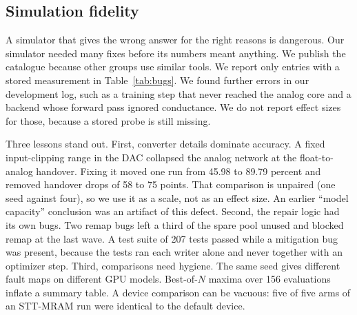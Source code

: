 \documentclass[journal]{IEEEtran}
\begin{document}
\subsection{Simulation fidelity}
\label{sec:fidelity}
A simulator that gives the wrong answer for the right reasons is dangerous.
Our simulator needed many fixes before its numbers meant anything.
We publish the catalogue because other groups use similar tools.
We report only entries with a stored measurement in Table~\ref{tab:bugs}.
We found further errors in our development log, such as a training step that never reached the analog core and a backend whose forward pass ignored conductance.
We do not report effect sizes for those, because a stored probe is still missing.

Three lessons stand out.
First, converter details dominate accuracy.
A fixed input-clipping range in the DAC collapsed the analog network at the float-to-analog handover.
Fixing it moved one run from 45.98 to 89.79 percent and removed handover drops of 58 to 75 points.
That comparison is unpaired (one seed against four), so we use it as a scale, not as an effect size.
An earlier ``model capacity'' conclusion was an artifact of this defect.
Second, the repair logic had its own bugs.
Two remap bugs left a third of the spare pool unused and blocked remap at the last wave.
A test suite of 207 tests passed while a mitigation bug was present, because the tests ran each writer alone and never together with an optimizer step.
Third, comparisons need hygiene.
The same seed gives different fault maps on different GPU models.
Best-of-$N$ maxima over 156 evaluations inflate a summary table.
A device comparison can be vacuous: five of five arms of an STT-MRAM run were identical to the default device.
\end{document}
